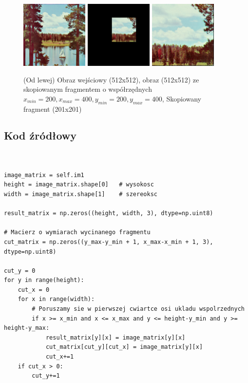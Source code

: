 \documentclass[final,a4paper,openany,12pt]{mwbk}
\begin{document}
\begin{figure}[H]
	\begin{center}
		\includegraphics[width=0.3\textwidth]{2/2Geo_Copy_Original}
		\includegraphics[width=0.3\textwidth]{2/2Geo_Copy_Result}
		\includegraphics[width=0.3\textwidth]{2/2Geo_Copy_Result_Interp}
	\end{center}
	\caption{(Od lewej) Obraz wejściowy (512x512), obraz (512x512) ze skopiowanym fragmentem o współrzędnych $x_{min}=200, x_{max}=400, y_{min}=200, y_{max}=400$, Skopiowany fragment (201x201) }
\end{figure}


\subsection*{Kod źródłowy}

\begin{lstlisting}[caption= Kopiowanie fragmentów obrazów]


image_matrix = self.im1
height = image_matrix.shape[0]   # wysokosc
width = image_matrix.shape[1]    # szereoksc

result_matrix = np.zeros((height, width, 3), dtype=np.uint8)

# Macierz o wymiarach wycinanego fragmentu
cut_matrix = np.zeros((y_max-y_min + 1, x_max-x_min + 1, 3), dtype=np.uint8)

cut_y = 0
for y in range(height):
    cut_x = 0
    for x in range(width): 
        # Poruszamy sie w pierwszej cwiartce osi ukladu wspolrzednych
        if x >= x_min and x <= x_max and y <= height-y_min and y >= height-y_max:    
            result_matrix[y][x] = image_matrix[y][x]
            cut_matrix[cut_y][cut_x] = image_matrix[y][x]
            cut_x+=1
    if cut_x > 0:    
        cut_y+=1

\end{lstlisting}
\newpage
\end{document}
